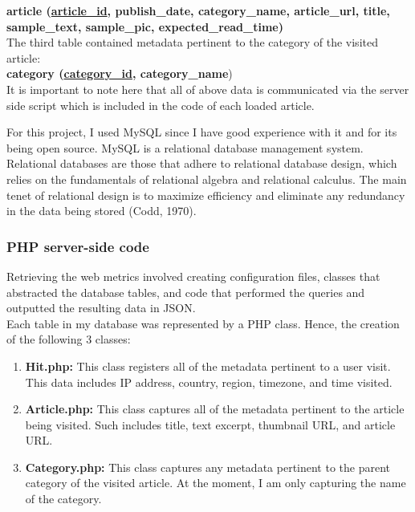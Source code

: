 \documentclass[12pt]{article}
\begin{document}
{\textbf{article (\underline{article\_id}, publish\_date, category\_name, article\_url, title, sample\_text, sample\_pic, expected\_read\_time)} \\ 

\noindent The third table contained metadata pertinent to the category of the visited article:\\
{\textbf{category (\underline{category\_id}, category\_name})}
\\ 

\noindent It is important to note here that all of above data is communicated via the server side script which is included in the code of each loaded article. 

\newpage

For this project, I used MySQL since I have good experience with it and for its being open source. MySQL is a relational database management system. Relational databases are those that adhere to relational database design, which relies on the fundamentals of relational algebra and relational calculus. The main tenet of relational design is to maximize efficiency and eliminate any redundancy in the data being stored (Codd, 1970).


\newpage

\subsubsection{PHP server-side code}
Retrieving the web metrics involved creating configuration files, classes that abstracted the database tables, and code that performed the queries and outputted the resulting data in JSON. \\


Each table in my database was represented by a PHP class. Hence, the creation of the following 3 classes:
\begin{enumerate}
\item{\textbf{Hit.php:}} This class registers all of the metadata pertinent to a user visit. This data includes IP address, country, region, timezone, and time visited. 
\item{\textbf{Article.php:}} This class captures all of the metadata pertinent to the article being visited. Such includes title, text excerpt, thumbnail URL, and article URL.
\item{\textbf{Category.php:}} This class captures any metadata pertinent to the parent category of the visited article. At the moment, I am only capturing the name of the category.
\end{enumerate}

}
\end{document}
